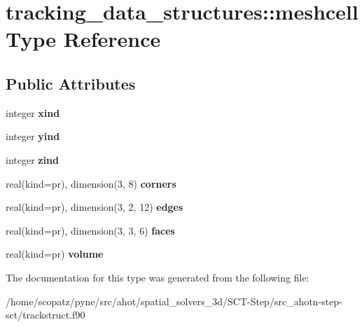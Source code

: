 \hypertarget{structtracking__data__structures_1_1meshcell}{\section{tracking\-\_\-data\-\_\-structures\-:\-:meshcell Type Reference}
\label{structtracking__data__structures_1_1meshcell}
}
\subsection*{Public Attributes}
\begin{DoxyCompactItemize}
\item 
\hypertarget{structtracking__data__structures_1_1meshcell_afd4a41c0924cdfa672043dff98383247}{integer {\bfseries xind}}\label{structtracking__data__structures_1_1meshcell_afd4a41c0924cdfa672043dff98383247}

\item 
\hypertarget{structtracking__data__structures_1_1meshcell_aaf221593bf60310472dfdcc78d6c2e79}{integer {\bfseries yind}}\label{structtracking__data__structures_1_1meshcell_aaf221593bf60310472dfdcc78d6c2e79}

\item 
\hypertarget{structtracking__data__structures_1_1meshcell_ae19a4af32e3f12bfa8042da05505aa6e}{integer {\bfseries zind}}\label{structtracking__data__structures_1_1meshcell_ae19a4af32e3f12bfa8042da05505aa6e}

\item 
\hypertarget{structtracking__data__structures_1_1meshcell_a13fcf4021ce5a5d1579ffbff38aaf33d}{real(kind=pr), dimension(3, 8) {\bfseries corners}}\label{structtracking__data__structures_1_1meshcell_a13fcf4021ce5a5d1579ffbff38aaf33d}

\item 
\hypertarget{structtracking__data__structures_1_1meshcell_a4edd8593d1bb0badbc5d723780d2c6c5}{real(kind=pr), dimension(3, 2, 12) {\bfseries edges}}\label{structtracking__data__structures_1_1meshcell_a4edd8593d1bb0badbc5d723780d2c6c5}

\item 
\hypertarget{structtracking__data__structures_1_1meshcell_a8b0a596007ab35b13961d9037d7b6e44}{real(kind=pr), dimension(3, 3, 6) {\bfseries faces}}\label{structtracking__data__structures_1_1meshcell_a8b0a596007ab35b13961d9037d7b6e44}

\item 
\hypertarget{structtracking__data__structures_1_1meshcell_a1a08090e934eae80b9b27f55c4ccaa00}{real(kind=pr) {\bfseries volume}}\label{structtracking__data__structures_1_1meshcell_a1a08090e934eae80b9b27f55c4ccaa00}

\end{DoxyCompactItemize}


The documentation for this type was generated from the following file\-:\begin{DoxyCompactItemize}
\item 
/home/scopatz/pyne/src/ahot/spatial\-\_\-solvers\-\_\-3d/\-S\-C\-T-\/\-Step/src\-\_\-ahotn-\/step-\/sct/trackstruct.\-f90\end{DoxyCompactItemize}
